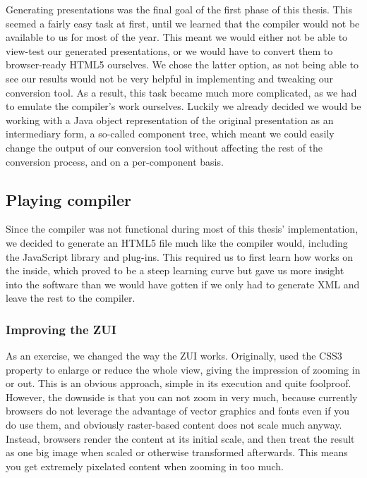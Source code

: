    Generating \mxp presentations was the final goal of the first phase of this
   thesis. This seemed a fairly easy task at first, until we learned that the
   \mxp compiler would not be available to us for most of the year. This meant
   we would either not be able to view-test our generated presentations, or we
   would have to convert them to browser-ready HTML5 ourselves. We chose the
   latter option, as not being able to see our results would not be very
   helpful in implementing and tweaking our conversion tool. As a result, this
   task became much more complicated, as we had to emulate the compiler's work
   ourselves. Luckily we already decided we would be working with a Java object
   representation of the original presentation as an intermediary form, a
   so-called component tree, which meant we could easily change the output of
   our conversion tool without affecting the rest of the conversion process,
   and on a per-component basis.


   \subsection{Playing \mxp compiler}

    Since the \mxp compiler was not functional during most of this thesis'
    implementation, we decided to generate an HTML5 file much like the \mxp
    compiler would, including the \mxp JavaScript library and plug-ins. This
    required us to first learn how \mxp works on the inside, which proved to be
    a steep learning curve but gave us more insight into the software than we
    would have gotten if we only had to generate \mxp XML and leave the rest to
    the compiler.

    \subsubsection{Improving the ZUI}
   
     As an exercise, we changed the way the ZUI works. Originally, \mxp used
     the CSS3  property to enlarge or reduce the whole
     view, giving the impression of zooming in or out. This is an obvious
     approach, simple in its execution and quite foolproof. However, the
     downside is that you can not zoom in very much, because currently browsers
     do not leverage the advantage of vector graphics and fonts even if you do
     use them, and obviously raster-based content does not scale much anyway.
     Instead, browsers render the content at its initial scale, and then treat
     the result as one big image when scaled or otherwise transformed
     afterwards. This means you get extremely pixelated content when zooming in
     too much.

